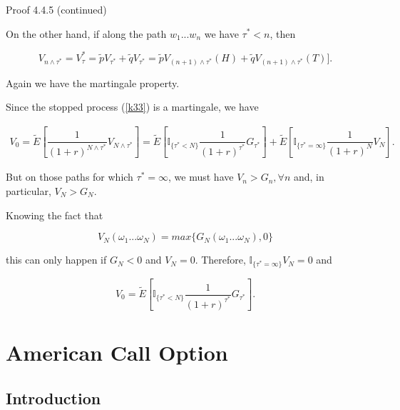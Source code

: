 \documentclass[c, dvipsnames, 8pt]{beamer}
\begin{document}
\begin{frame}[shrink=5]
\frametitle{\insertsection} 
\framesubtitle{\insertsubsection} 


\begin{block}{Proof 4.4.5 (continued)}
\end{block}

On the other hand,
if along the path  $w_1...w_n$ we have $\tau^* < n$, then


\begin{equation}
V_{n \wedge \tau^*} = V_\tau^* = \tilde{p}V_{\tau^*}  + \tilde{q}V_{\tau^*}  = \tilde{p}V_{(n+1) \wedge \tau^*}(H)  + \tilde{q}V_{(n+1) \wedge \tau^*}(T) ].
\end{equation}

Again we have the martingale property.

Since the stopped process (\ref{k33}) is a martingale, we have

\begin{multline}
V_0  = \tilde{E} \left[ \dfrac{1}{(1+r)^{N \wedge \tau^*} } V_{N \wedge \tau^*}  \right] = \tilde{E} \left[ \mathbb{I}_{\{\tau^* < N\}} \dfrac{1}{(1+r)^{ \tau^*} } G_{\tau^*}  \right]  + \tilde{E} \left[ \mathbb{I}_{\{\tau^* = \infty\}} \dfrac{1}{(1+r)^{N } } V_{N }  \right].
\end{multline}

But on those paths for which $\tau^* = \infty$, we must have $V_n > G_n, \forall n $  and,
in particular, $V_N > G_N$. 

Knowing the fact that 

\begin{equation}\label{key}
V_N(\omega_1...\omega_N)=max\{G_N(\omega_1...\omega_N),0\}
\end{equation}

this can only happen if $G_N < 0$
and $V_N = 0$. Therefore, $\mathbb{I}_{\{\tau^* = \infty\}}V_N=0$  and 

\begin{equation}
V_0  = \tilde{E} \left[ \mathbb{I}_{\{\tau^* < N\}} \dfrac{1}{(1+r)^{ \tau^*} } G_{\tau^*}  \right]  .
\end{equation}



\end{frame}	

\section{American Call Option}
\subsection{Introduction}
\end{document}
